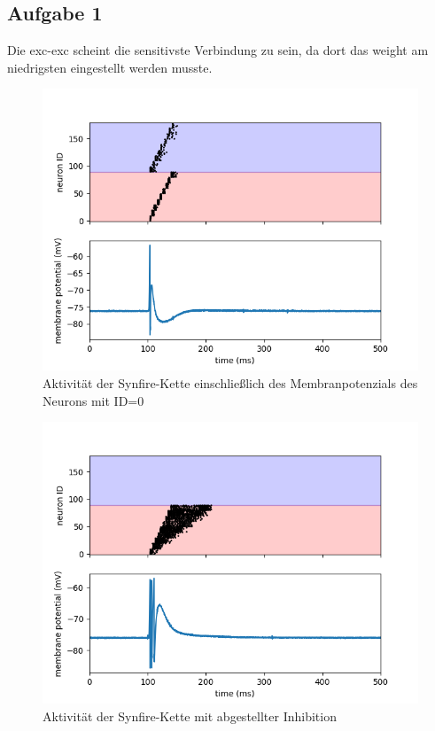 \documentclass[10pt,a4paper]{scrartcl}
\begin{document}
\subsection{Aufgabe 1}

Die exc-exc scheint die sensitivste Verbindung zu sein, da dort das weight am niedrigsten eingestellt werden musste. 



\begin{figure} [ht]
\begin{center}
\label{fig:abb4}
\caption{Aktivität der Synfire-Kette einschließlich des Membranpotenzials des Neurons mit ID=0}
\includegraphics[scale=0.35]{pictures/task1_synfire_chain.png}
\end{center}
\end{figure}

\begin{figure} [ht]
\begin{center}
\label{fig:abb4}
\caption{Aktivität der Synfire-Kette mit abgestellter Inhibition}
\includegraphics[scale=0.35]{pictures/synfire_chain_disable_inhibition.png}
\end{center}
\end{figure}
\end{document}
